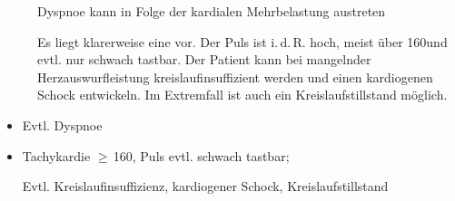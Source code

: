 {\TxABCDE}
{
\begin{description}
  \item[] Dyspnoe kann in Folge der kardialen Mehrbelastung austreten
  \item[] Es liegt klarerweise eine  vor. Der Puls
  ist i.\,d.\,R. hoch, meist über 160\PerMin* und evtl. nur schwach tastbar. Der Patient kann bei mangelnder Herzauswurfleistung kreislaufinsuffizient werden und einen kardiogenen Schock entwickeln. Im Extremfall ist auch ein Kreislaufstillstand möglich. 
\end{description}
}
{
\begin{itemize}
  \item[\ABCDE{B}] Evtl. Dyspnoe
  \item[\ABCDE{C}] Tachykardie $\geq$\,160\PerMin*, Puls evtl. schwach tastbar; 
  
  Evtl. Kreislaufinsuffizienz, kardiogener Schock, Kreislaufstillstand
\end{itemize}
}
{}
{}
{}

